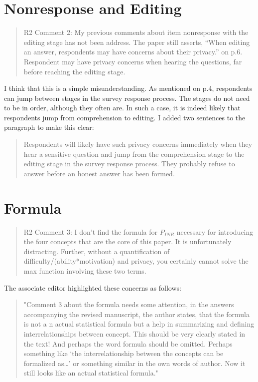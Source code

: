 \documentclass[a4paper, 12pt]{article}
\begin{document}
\section{Nonresponse and Editing}

\begin{quotation}
R2 Comment 2: My previous comments about item nonresponse with the editing stage has not been address. The paper still asserts, “When editing an answer, respondents may have concerns about their privacy.” on p.6. Respondent may have privacy concerns when hearing the questions, far before reaching the editing stage.
\end{quotation}

I think that this is a simple misunderstanding. As mentioned on p.4, respondents can jump between stages in the survey response process. The stages do not need to be in order, although they often are. In such a case, it is indeed likely that respondents jump from comprehension to editing. I added two sentences to the paragraph to make this clear:

\begin{quotation}
Respondents will likely have such privacy concerns immediately when they hear a sensitive question and jump from the comprehension stage to the editing stage in the survey response process. They probably refuse to answer before an honest answer has been formed.
\end{quotation}


\section{Formula}

\begin{quotation}
R2 Comment 3: I don’t find the formula for $P_{INR}$ necessary for introducing the four concepts that are the core of this paper. It is unfortunately distracting. Further, without a quantification of difficulty/(ability*motivation) and privacy, you certainly cannot solve the max function involving these two terms.
\end{quotation}

The associate editor highlighted these concerns as follows:

\begin{quotation}
"Comment 3 about the formula needs some attention, in the answers accompanying the revised manuscript, the author states, that the formula is not a n actual statistical formula but a help in summarizing and defining interrelationships between concept. This should be very clearly stated in the text!  And perhaps the word formula should be omitted. Perhaps something like ‘the interrelationship between the concepts can be formalized as…’ or something similar in the own words of author.  Now it still looks like an actual statistical formula."
\end{quotation}
\end{document}
